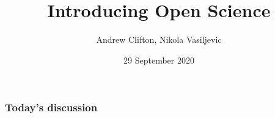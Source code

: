 \documentclass[mode=nonstop,xcolor=dvipsnames,aspectratio=1610]{beamer}
\title{\bf Introducing Open Science}
\institute[University of Stuttgart]{LIKE Open Science Course}
\author[Andy Clifton]{Andrew Clifton, Nikola Vasiljevic}
\date{29 September 2020}
\begin{document}


\begin{frame}
  \frametitle{Today's discussion}
    \tableofcontents
\end{frame}







\end{document}

